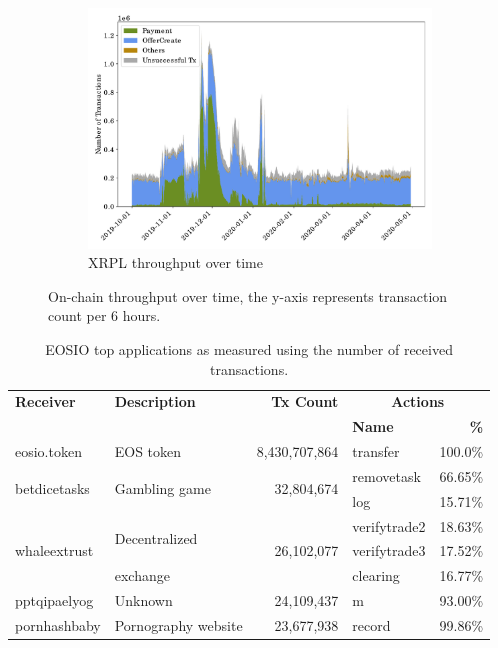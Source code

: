 \begin{figure}[tbp]
\begin{subfigure}{\columnwidth}
        \includegraphics[height=.27\textheight]{./4-transactions-security/figures/xrp-chart-area.pdf}
        \caption{XRPL throughput over time}
        \label{fig:xrp-throughput-time}
    \end{subfigure}
    \caption[On-chain throughput over time]{On-chain throughput over time, the y-axis represents transaction count per 6 hours.}
    \label{fig:throughput-time}
\end{figure}

\begin{table}[tb]
    \centering
\caption[EOSIO top applications]{EOSIO top applications as measured using the number of received transactions.}
    \label{tab:eos-top-applications}
    \setlength{\tabcolsep}{2pt}
    \begin{tabular}{l l r l r}
    \toprule
    \textbf{Receiver} & \textbf{Description} & \textbf{Tx Count} & \multicolumn{2}{c}{\bf Actions}\\
         &         &    &  \bf Name   & \bf \% \\
    \midrule
      eosio.token & EOS token & 8,430,707,864 & transfer & 100.0\%\\
      \midrule
      \multirow{2}{*}{betdicetasks} & \multirow{2}{*}{Gambling game} & \multirow{2}{*}{32,804,674} & removetask & 66.65\%\\
                      & & & log & 15.71\%\\
      \midrule
      \multirow{3}{*}{whaleextrust} & \multirow{2}{*}{Decentralized} & \multirow{3}{*}{26,102,077} & verifytrade2 & 18.63\%\\
                      & & & verifytrade3 & 17.52\%\\
                      & exchange & & clearing & 16.77\%\\
      \midrule
      pptqipaelyog & Unknown & 24,109,437 & m & 93.00\%\\
      \midrule
      pornhashbaby & Pornography website & 23,677,938 & record & 99.86\%\\
    \bottomrule
    \end{tabular}
\end{table}


